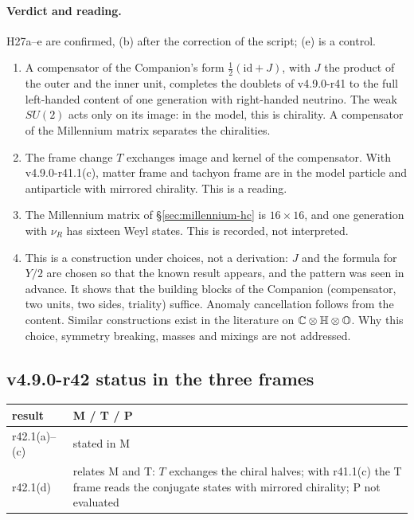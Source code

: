 \paragraph{Verdict and reading.}
H27a--e are confirmed, (b) after the correction of the script; (e) is a control.
\begin{enumerate}[leftmargin=2em]
\item A compensator of the Companion's form \(\tfrac12(\mathrm{id}+J)\), with \(J\) the product of the outer and the inner unit, completes
the doublets of v4.9.0-r41 to the full left-handed content of one generation with right-handed neutrino.  The weak \(SU(2)\) acts only
on its image: in the model, this is chirality.  A compensator of the Millennium matrix separates the chiralities.
\item The frame change \(T\) exchanges image and kernel of the compensator.  With v4.9.0-r41.1(c), matter frame and tachyon frame are in
the model particle and antiparticle with mirrored chirality.  This is a reading.
\item The Millennium matrix of \S\ref{sec:millennium-hc} is \(16\times16\), and one generation with \(\nu_R\) has sixteen Weyl states.  This is
recorded, not interpreted.
\item This is a construction under choices, not a derivation: \(J\) and the formula for \(Y/2\) are chosen so that the known result
appears, and the pattern was seen in advance.  It shows that the building blocks of the Companion (compensator, two units, two sides,
triality) suffice.  Anomaly cancellation follows from the content.  Similar constructions exist in the literature on
\(\mathbb C\otimes\mathbb{H}\otimes\mathbb{O}\).  Why this choice, symmetry breaking, masses and mixings are not addressed.
\end{enumerate}

\subsection*{v4.9.0-r42 status in the three frames}
\label{subsec:v490-r42-frames}

\begin{center}
\small
\begin{tabular}{@{}>{\raggedright\arraybackslash}p{}>{\raggedright\arraybackslash}p{}@{}}
\toprule
result & M / T / P\\
\midrule
r42.1(a)--(c) & stated in M\\
r42.1(d) & relates M and T: \(T\) exchanges the chiral halves; with r41.1(c) the T frame reads the conjugate states with mirrored chirality; P not evaluated\\
\bottomrule
\end{tabular}
\end{center}

